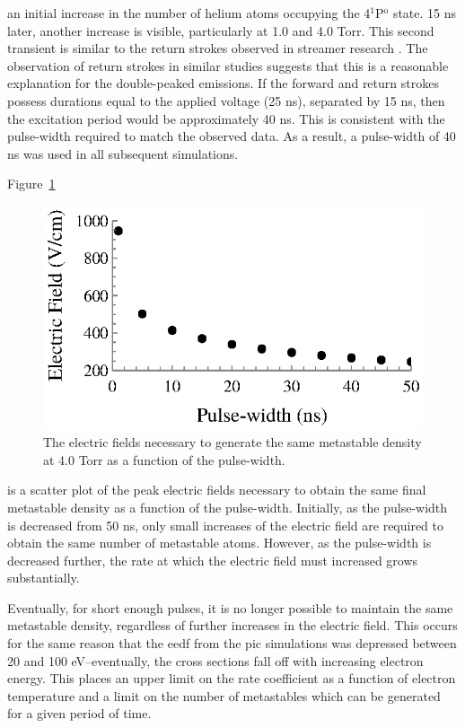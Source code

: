 an initial increase in the number of helium atoms occupying the
4$^1$P$^\mathrm{o}$ state. 15 ns later, another increase is visible,
particularly at 1.0 and 4.0 Torr. This second transient is similar to the return
strokes observed in streamer research \cite{Snoddy1936, Loeb1940, Mitchell1947}.
The observation of return strokes in similar studies \cite{Vasilyak1994,
Pai2009, Starikovskiy2013} suggests that this is a reasonable explanation for
the double-peaked emissions. If the forward and return strokes possess durations
equal to the applied voltage (25 ns), separated by 15 ns, then the excitation
period would be approximately 40 ns. This is consistent with the pulse-width
required to match the observed data. As a result, a pulse-width of 40 ns was
used in all subsequent simulations.

Figure~\ref{fig:fieldtau}
\begin{figure}
  \centering
  \includegraphics{./chapters/modeling/figures/fieldtau.eps}
  \caption{The electric fields necessary to generate the same metastable density
    at 4.0 Torr as a function of the pulse-width.}
  \label{fig:fieldtau}
\end{figure}
is a scatter plot of the peak electric fields necessary to obtain the same final
metastable density as a function of the pulse-width. Initially, as the
pulse-width is decreased from 50 ns, only small increases of the electric field
are required to obtain the same number of metastable atoms. However, as the
pulse-width is decreased further, the rate at which the electric field must
increased grows substantially.

Eventually, for short enough pulses, it is no longer possible to maintain the
same metastable density, regardless of further increases in the electric field.
This occurs for the same reason that the \acs{eedf} from the \acs{pic}
simulations was depressed between 20 and 100 eV--eventually, the cross sections
fall off with increasing electron energy. This places an upper limit on the rate
coefficient as a function of electron temperature and a limit on the number of
metastables which can be generated for a given period of time.

